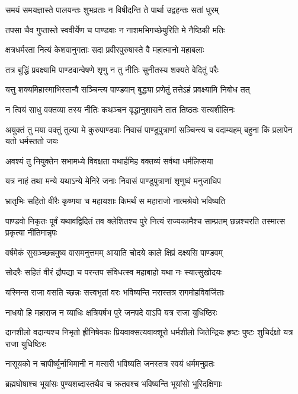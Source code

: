\twolineshloka
{समयं समयज्ञास्ते पालयन्तः शुभव्रताः}
{न विषीदन्ति ते पार्था उद्वहन्तः सतां धुरम्}


\twolineshloka
{तपसा चैव गुप्तास्ते स्ववीर्येण च पाण्डवाः}
{न नाशमभिगच्छेयुरिति मे नैष्ठिकी मतिः}


\twolineshloka
{क्षत्रधर्मरता नित्यं केशवानुगताः सदा}
{प्रवीरपुरुषास्ते वै महात्मानो महाबलाः}


\twolineshloka
{तत्र बुद्धिं प्रवक्ष्यामि पाण्डवान्वेषणे शृणु}
{न तु नीतिः सुनीतस्य शक्यते वेदितुं परैः}


\twolineshloka
{यत्तु शक्यमिहास्माभिस्तान्वै सञ्चिन्त्य पाण्डवान्}
{बुद्ध्या प्रणेतुं तत्तेऽहं प्रवक्ष्यामि निबोध तत्}


\twolineshloka
{न त्वियं साधु वक्तव्या तस्य नीतिः कथञ्चन}
{वृद्धानुशासने तात तिष्ठतः सत्यशीलिनः}


\threelineshloka
{अयुक्तं तु मया वक्तुं तुल्या मे कुरुपाण्डवाः}
{निवासं पाण्डुपुत्राणां सञ्चिन्त्य च वदाम्यहम्}
{बहुना किं प्रलापेन यतो धर्मस्ततो जयः}


\twolineshloka
{अवश्यं तु नियुक्तेन सभामध्ये विवक्षता}
{यथार्हमिह वक्तव्यं सर्वथा धर्मलिप्सया}


\twolineshloka
{यत्र नाहं तथा मन्ये यथाऽन्ये मेनिरे जनाः}
{निवासं पाण्डुपुत्राणां शृणुष्वं मनुजाधिप}


\twolineshloka
{भ्रातृभिः सहितो वीरैः कृष्णया च महायशाः}
{किमर्थं स महाराजो नात्मश्रेयो भविष्यति}


\threelineshloka
{पाण्डवो निकृतः पूर्वं यथावद्विदितं तव}
{क्लेशितश्च पुरे नित्यं राज्यकामैश्च साम्प्रतम्}
{छन्नश्चरति तस्मात्स प्रकृत्या नीतिमान्नृपः}


\twolineshloka
{वर्षमेकं सुसञ्च्छन्नमुष्य वासमनुत्तमम्}
{आयाति चोदये काले क्षिप्रं दक्ष्यसि पाण्डवम्}


\twolineshloka
{सोदरैः सहितं वीरं द्रौपद्या च परन्तप}
{संविधत्स्व महाबाहो यथा नः स्यात्सुखोदयः}


\twolineshloka
{यस्मिन्स राजा वसति च्छन्नः सत्त्वभृतां वरः}
{भविष्यन्ति नरास्तत्र रागमोहविवर्जिताः}


\twolineshloka
{नाधयो हि महाराज न व्याधिः क्षत्रियर्षभ}
{पुरे जनपदे वाऽपि यत्र राजा युधिष्ठिरः}


\threelineshloka
{दानशीलो वदान्यश्च निभृतो ह्रीनिषेवकः}
{प्रियवाक्सत्यवाक्शूरो धर्मशीलो जितेन्द्रियः}
{हृष्टः पुष्टः शुचिर्दक्षो यत्र राजा युधिष्ठिरः}


\twolineshloka
{नासूयको न चापीर्ष्युर्नाभिमानी न मत्सरी}
{भविष्यति जनस्तत्र स्वयं धर्ममनुव्रतः}


\twolineshloka
{ब्रह्मघोषाश्च भूयांसः पुण्यशब्दास्तथैव च}
{क्रतवश्च भविष्यन्ति भूयांसो भूरिदक्षिणाः}


